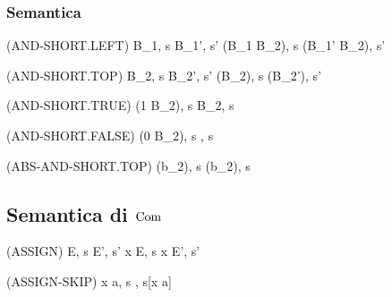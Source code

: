 \subsubsection{Semantica}
\begin{center}
	(AND-SHORT.LEFT)
	\prooftree
		\langle B_1, s \rangle \rightarrow \langle B_1', s' \rangle
		\justifies
		\langle (B_1 \land B_2), s \rangle \rightarrow \langle (B_1' \land B_2), s' \rangle
	\endprooftree
\end{center}

\begin{center}
	(AND-SHORT.TOP)
	\prooftree
		\langle B_2, s \rangle \rightarrow \langle B_2', s' \rangle
		\justifies
		\langle (\top \land B_2), s \rangle \rightarrow \langle (\top \land B_2'), s' \rangle
	\endprooftree
\end{center}

\begin{center}
	(AND-SHORT.TRUE)
	\prooftree
		\justifies
		\langle (1 \land B_2), s \rangle \rightarrow \langle B_2, s \rangle
	\endprooftree
\end{center}

\begin{center}
	(AND-SHORT.FALSE)
	\prooftree
		\justifies
		\langle (0 \land B_2), s \rangle \rightarrow {}, s \rangle
	\endprooftree
\end{center}

\begin{center}
	(ABS-AND-SHORT.TOP)
	\prooftree
		\justifies
		\langle (\top \land b_2), s \rangle \rightarrow \langle (\top \absand b_2), s \rangle
	\endprooftree
\end{center}

\subsection{Semantica di $\mathrm{Com}$}

\begin{center}
	(ASSIGN)
	\prooftree
		\langle E, s \rangle \rightarrow \langle E', s' \rangle
		\justifies
		\langle x \weq E, s \rangle \rightarrow \langle x \weq E', s' \rangle
	\endprooftree
\end{center}

\begin{center}
	(ASSIGN-SKIP)
	\prooftree
		\justifies
		\langle x \weq a, s \rangle \rightarrow \langle {}, s[x \mapsto a] \rangle
	\endprooftree
\end{center}

